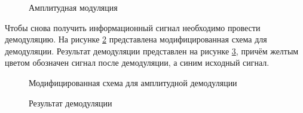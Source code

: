 \documentclass[a4paper,14pt]{extarticle}
\begin{document}
\begin{figure}[H]
\caption{Амплитудная модуляция}
\label{004}
\end{figure}

Чтобы снова получить информационный сигнал необходимо провести демодуляцию. На рисунке \ref{005} представлена модифицированная схема для демодуляции. Результат демодуляции представлен на рисунке \ref{006}, причём желтым цветом обозначен сигнал после демодуляции, а синим исходный сигнал.

\begin{figure}[H]
\caption{Модифицированная схема для амплитудной демодуляции}
\label{005}
\end{figure}

\begin{figure}[H]
\caption{Результат демодуляции}
\label{006}
\end{figure}
\end{document}
